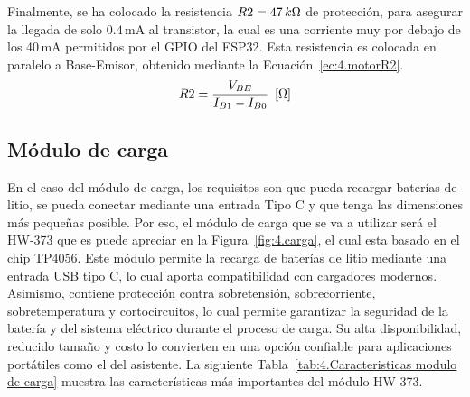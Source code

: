 Finalmente, se ha colocado la resistencia $R2 = 47\,k\text{\si{\ohm}}$ de protección, para asegurar la llegada de solo $0.4\, \si{\milli\ampere}$ al transistor, la cual es una corriente muy por debajo de los 40\,mA permitidos por el GPIO del ESP32. Esta resistencia es colocada en paralelo a Base-Emisor, obtenido mediante la Ecuación~\ref{ec:4.motorR2}.
\begin{align}
\label{ec:4.motorR2}
R2=\frac{V_{BE}}{I_{B1}-I_{B0}}\,\,\,\text{[\si{\ohm}]}
\end{align}

\subsection{Módulo de carga}
En el caso del módulo de carga, los requisitos son que pueda recargar baterías de litio, se pueda conectar mediante una entrada Tipo C y que tenga las dimensiones más pequeñas posible. Por eso, el módulo de carga que se va a utilizar será el HW-373 que es puede apreciar en la Figura~\ref{fig:4.carga}, el cual esta basado en el chip TP4056. Este módulo permite la recarga de  baterías de litio mediante una entrada USB tipo C, lo cual aporta compatibilidad con cargadores modernos. Asimismo, contiene protección contra sobretensión, sobrecorriente, sobretemperatura y cortocircuitos, lo cual permite garantizar la seguridad de la batería y del sistema eléctrico durante el proceso de carga. Su alta disponibilidad, reducido tamaño y costo lo convierten en una opción confiable para aplicaciones portátiles como el del asistente. La siguiente Tabla~\ref{tab:4.Caracteristicas modulo de carga} muestra las características más importantes del módulo HW-373.

